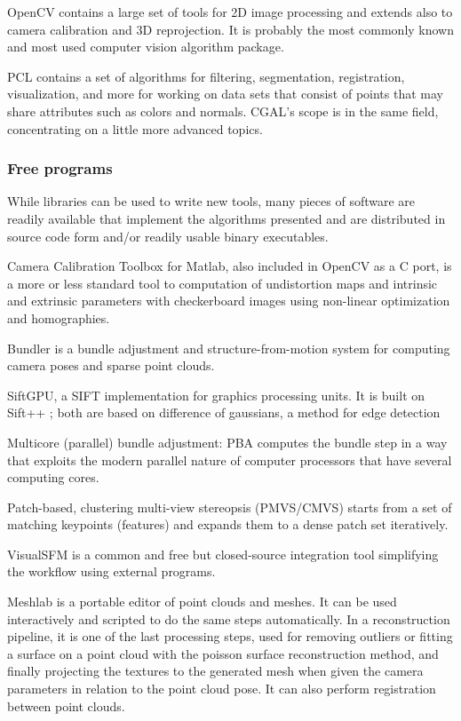 OpenCV contains a large set of tools for 2D image processing and extends also to camera calibration and 3D reprojection.
It is probably the most commonly known and most used computer vision algorithm package.

PCL contains a set of algorithms for filtering, segmentation, registration, visualization, and more for working on data sets that consist of points that may share attributes such as colors and normals. CGAL's scope is in the same field, concentrating on a little more advanced topics.


\subsubsection{Free programs} %

While libraries can be used to write new tools, many pieces of software are readily available that implement the algorithms presented and are distributed in source code form and/or readily usable binary executables.

Camera Calibration Toolbox for Matlab, also included in OpenCV as a C port, is a more or less standard tool to computation of undistortion maps and intrinsic and extrinsic parameters with checkerboard images using non-linear optimization and homographies. \cite{camcalmatlab}

Bundler is a bundle adjustment and structure-from-motion system for computing camera poses and sparse point clouds. \cite{snavely2006photo}

SiftGPU, a SIFT implementation for graphics processing units. \cite{changchang2007siftgpu} It is built on Sift++ \cite{vedaldi2011sift++}; both are based on difference of gaussians, a method for edge detection \cite{marr1980theory}

Multicore (parallel) bundle adjustment: PBA computes the bundle step in a way that exploits the modern parallel nature of computer processors that have several computing cores. \cite{wu2011multicore}

Patch-based, clustering multi-view stereopsis (PMVS/CMVS) starts from a set of matching keypoints (features) and expands them to a dense patch set iteratively. \cite{furukawa2010accurate,furukawa2012patch}

VisualSFM \cite{wu2013towards} is a common and free but closed-source integration tool simplifying the workflow using external programs.

Meshlab \cite{meshlab} is a portable editor of point clouds and meshes.
It can be used interactively and scripted to do the same steps automatically.
In a reconstruction pipeline, it is one of the last processing steps, used for removing outliers or fitting a surface on a point cloud with the poisson surface reconstruction method, and finally projecting the textures to the generated mesh when given the camera parameters in relation to the point cloud pose.
It can also perform registration between point clouds.

